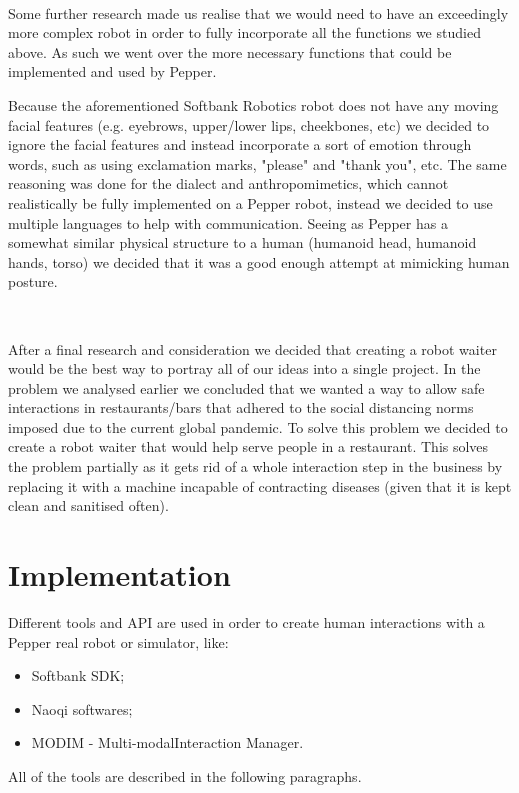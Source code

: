 \documentclass[12pt, letterpaper, twoside]{article}
\begin{document}
\

Some further research made us realise that we would need to have an exceedingly more complex robot in order to fully incorporate all the functions we studied above. As such we went over the more necessary functions that could be implemented and used by Pepper.

Because the aforementioned Softbank Robotics robot does not have any moving facial features (e.g. eyebrows, upper/lower lips, cheekbones, etc) we decided to ignore the facial features and instead incorporate a sort of emotion through words, such as using exclamation marks, "please" and "thank you", etc. The same reasoning was done for the dialect and anthropomimetics, which cannot realistically be fully implemented on a Pepper robot, instead we decided to use multiple languages to help with communication. Seeing as Pepper has a somewhat similar physical structure to a human (humanoid head, humanoid hands, torso) we decided that it was a good enough attempt at mimicking human posture.

\

After a final research and consideration we decided that creating a robot waiter would be the best way to portray all of our ideas into a single project.
In the problem we analysed earlier we concluded that we wanted a way to allow safe interactions in restaurants/bars that adhered to the social distancing norms imposed due to the current global pandemic. To solve this problem we decided to create a robot waiter that would help serve people in a restaurant. This solves the problem partially as it gets rid of a whole interaction step in the business by replacing it with a machine incapable of contracting diseases (given that it is kept clean and sanitised often). 

\section{Implementation}
Different tools and API are used in order to create human interactions with a Pepper real robot or simulator, like:

\begin{itemize}
	\item Softbank SDK;
	\item Naoqi softwares;
	\item MODIM - Multi-modalInteraction Manager.
\end{itemize}

All of the tools are described in the following paragraphs.\\
\end{document}

